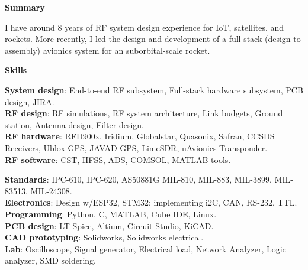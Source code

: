 \documentclass[10pt, Letter]{article}
\newcommand{\cvsection}[1]
{
	\begin{center}
		\large\textcolor{sectcol}{\textbf{#1}}
	\end{center}
}
\begin{document}
\cvsection{Summary}
\vspace{-5pt}
I have around 8 years of RF system design experience for IoT, satellites, and rockets. More recently, I led the design and development of a full-stack (design to assembly) avionics system for an suborbital-scale rocket. 
\vspace{-2pt}
\cvsection{Skills}
\vspace{-15pt}
\begin{multicols}{2}
\textbf{System design}: End-to-end RF subsystem, Full-stack hardware subsystem, PCB design, JIRA. \\
\textbf{RF design}: RF simulations, RF system architecture, Link budgets, Ground station, Antenna design, Filter design. \\
\textbf{RF hardware}: RFD900x, Iridium, Globalstar, Quasonix, Safran, CCSDS Receivers, Ublox GPS, JAVAD GPS, LimeSDR, uAvionics Transponder. \\
\textbf{RF software}: CST, HFSS, ADS, COMSOL, MATLAB tools.

\columnbreak

\textbf{Standards}: IPC-610, IPC-620, AS50881G MIL-810, MIL-883, MIL-3899, MIL-83513, MIL-24308. \\
\textbf{Electronics}: Design w/ESP32, STM32; implementing i2C, CAN, RS-232, TTL. \\
\textbf{Programming}: Python, C, MATLAB, Cube IDE, Linux. \\
\textbf{PCB design}: LT Spice, Altium, Circuit Studio, KiCAD. \\
\textbf{CAD prototyping}: Solidworks, Solidworks electrical. \\
\textbf{Lab}: Oscilloscope, Signal generator, Electrical load, Network Analyzer, Logic analyzer, SMD soldering. 
\end{multicols}

%
%

\end{document}
